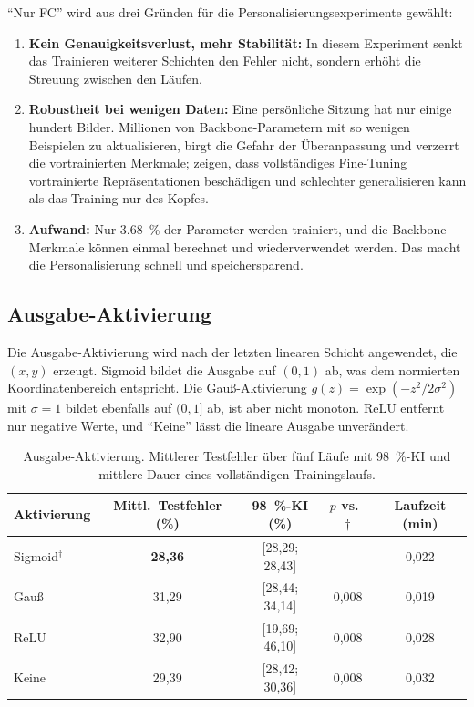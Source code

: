 \documentclass[
  11pt,
  a4paper,
  oneside,
  DIV=12,
  BCOR=8mm,
  parskip=half,
  headings=normal,
  bibliography=totoc,
  listof=totoc
]{scrreprt}
\newcommand{\sel}{\ensuremath{^{\dagger}}}
\begin{document}
\enquote{Nur FC} wird aus drei Gründen für die Personalisierungsexperimente
gewählt:
\begin{enumerate}[nosep]
  \item \textbf{Kein Genauigkeitsverlust, mehr Stabilität:} In diesem
        Experiment senkt das Trainieren weiterer Schichten den Fehler nicht,
        sondern erhöht die Streuung zwischen den Läufen.
  \item \textbf{Robustheit bei wenigen Daten:} Eine persönliche Sitzung hat
        nur einige hundert Bilder. Millionen von Backbone-Parametern mit so
        wenigen Beispielen zu aktualisieren, birgt die Gefahr der
        Überanpassung und verzerrt die vortrainierten Merkmale;
        \citet{kumar2022finetuning} zeigen, dass vollständiges Fine-Tuning
        vortrainierte Repräsentationen beschädigen und schlechter
        generalisieren kann als das Training nur des Kopfes.
  \item \textbf{Aufwand:} Nur \SI{3,68}{\percent} der Parameter werden
        trainiert, und die Backbone-Merkmale können einmal berechnet und
        wiederverwendet werden. Das macht die Personalisierung schnell und
        speichersparend.
\end{enumerate}

\subsection{Ausgabe-Aktivierung}
\label{sec:activation}

Die Ausgabe-Aktivierung wird nach der letzten linearen Schicht angewendet,
die $(x,y)$ erzeugt. Sigmoid bildet die Ausgabe auf $(0,1)$ ab, was dem
normierten Koordinatenbereich entspricht. Die Gauß-Aktivierung
$g(z)=\exp(-z^2/2\sigma^2)$ mit $\sigma=1$ bildet ebenfalls auf $(0,1]$ ab, ist
aber nicht monoton. ReLU entfernt nur negative Werte, und \enquote{Keine}
lässt die lineare Ausgabe unverändert.

\begin{table}[htbp]
  \centering
  \caption{Ausgabe-Aktivierung. Mittlerer Testfehler über fünf Läufe mit
           \SI{98}{\percent}-KI und mittlere Dauer eines vollständigen
           Trainingslaufs.}
  \label{tab:activation}
  \small
  \begin{tabular}{lcccc}
    \toprule
    Aktivierung & Mittl.\ Testfehler (\%) & \SI{98}{\percent}-KI (\%) & $p$ vs.\ $\dagger$ & Laufzeit (min) \\
    \midrule
    Sigmoid\sel{}    & \textbf{28,36} & [28,29; 28,43] & ---   & 0,022 \\
    Gauß             & 31,29 & [28,44; 34,14] & 0,008 & 0,019 \\
    ReLU             & 32,90 & [19,69; 46,10] & 0,008 & 0,028 \\
    Keine            & 29,39 & [28,42; 30,36] & 0,008 & 0,032 \\
    \bottomrule
  \end{tabular}
\end{table}
\end{document}
